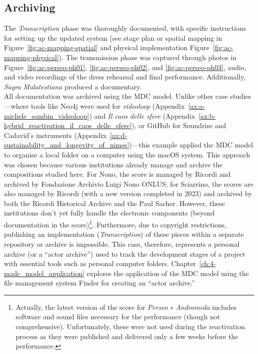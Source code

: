 \subsection*{Archiving}
The \textit{Transcription} phase was thoroughly documented, with specific instructions for setting up the updated system (see stage plan or spatial mapping in Figure~\ref{fig:ac-mapping-spatial} and physical implementation Figure~\ref{fig:ac-mapping-physical}). The transmission phase was captured through photos in Figure~\ref{fig:ac-perseo-ph01}, \ref{fig:ac-perseo-ph02}, and \ref{fig:ac-perseo-ph03}, audio, and video recordings of the dress rehearsal and final performance. Additionally, \textit{Sagra Malatestiana} produced a documentary.\\
All documentation was archived using the MDC model. Unlike other case studies—where tools like Neo4j were used for \textit{videoloop} (Appendix~\ref{ax:a-michele_sambin_videoloop}) and \textit{Il caos delle sfere} (Appendix~\ref{ax:b-hybrid_reactivation_il_caos_delle_sfere}), or GitHub for Soundrise and Cadavid’s instruments (Appendix~\ref{ax:d-sustainability_and_longevity_of_nimes})—this example applied the MDC model to organise a local folder on a computer using the macOS system. This approach was chosen because various institutions already manage and archive the compositions studied here. For Nono, the score is managed by Ricordi and archived by Fondazione Archivio Luigi Nono ONLUS; for Sciarrino, the scores are also managed by Ricordi (with a new version completed in 2023) and archived by both the Ricordi Historical Archive and the Paul Sacher. However, these institutions don’t yet fully handle the electronic components (beyond documentation in the score)\footnote{Actually, the latest version of the score for \textit{Perseo e Andromeda} includes software and sound files necessary for the performance (though not comprehensive). Unfortunately, these were not used during the reactivation process as they were published and delivered only a few weeks before the performance.}. Furthermore, due to copyright restrictions, publishing an implementation (\textit{Transcription}) of these pieces within a separate repository or archive is impossible. This case, therefore, represents a personal archive (or a ``actor archive'') used to track the development stages of a project with essential tools such as personal computer folders. Chapter~\ref{ch:4-madc_model_application} explores the application of the MDC model using the file management system Finder for creating an ``actor archive.''

